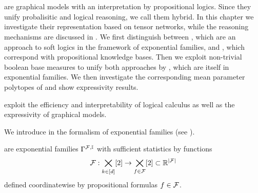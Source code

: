 \chapter{\chatextnetworkRepresentation}\label{cha:networkRepresentation}

\HybridLogicNetworks{} are graphical models with an interpretation by propositional logics.
Since they unify probalisitic and logical reasoning, we call them hybrid.
In this chapter we investigate their representation based on tensor networks, while the reasoning mechanisms are discussed in .
We first distinguish between \MarkovLogicNetworks{}, which are an approach to soft logics in the framework of exponential families, and \HardLogicNetworks{}, which correspond with propositional knowledge bases.
Then we exploit non-trivial boolean base measures to unify both approaches by \HybridLogicNetworks{}, which are itself in exponential families.
We then investigate the corresponding mean parameter polytopes of \HybridLogicNetworks{} and show expressivity results.



\sect{\MarkovLogicNetworks{}}

\MarkovLogicNetworks{} exploit the efficiency and interpretability of logical calculus as well as the expressivity of graphical models.


We introduce \MarkovLogicNetworks{} in the formalism of exponential families (see ).

\begin{definition}[\MarkovLogicNetwork]
    \label{def:mln}
    \MarkovLogicNetworks{} are exponential families $\Gamma^{\mathcal{F},\mathbb{I}}$ with sufficient statistics by functions
    \begin{align*}
        \mathcal{F} : \bigtimes_{k\in[d]}[2] \rightarrow \bigtimes_{f\in\mathcal{F}}[2] \subset \mathbb{R}^{\left|\mathcal{F}\right|}
    \end{align*}
    defined coordinatewise by propositional formulas $f\in\mathcal{F}$.
\end{definition}

